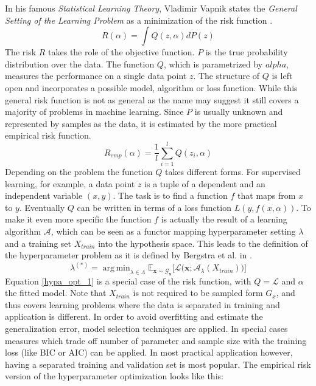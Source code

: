 \documentclass[english]{article}
\newcommand{\x}{\mathbf{x}}
\newcommand{\E}{\mathbb{E}}
\DeclareMathOperator*{\argmin}{arg\,min}
\begin{document}
In his famous \textit{Statistical Learning Theory}, Vladimir Vapnik states the \textit{General Setting of the Learning Problem} as a minimization of the risk function \cite{vapnik_overview_1999}.
\begin{equation}
R(\alpha) = \int Q(z,\alpha)dP(z)
\label{risk}
\end{equation}
The risk $R$ takes the role of the objective function. $P$ is the true probability distribution over the data. The function $Q$, which is parametrized by $alpha$, measures the performance on a single data point $z$. The structure of $Q$ is left open and incorporates a possible model, algorithm or loss function. While this general risk function is not as general as the name may suggest it still covers a majority of problems in machine learning. Since $P$ is usually unknown and represented by samples as the data, it is estimated by the more practical empirical risk function.
\begin{equation}
R_{emp}(\alpha) = \frac{1}{l} \sum_{i=1}^l Q(z_i,\alpha)
\label{empirical risk}
\end{equation}
Depending on the problem the function $Q$ takes different forms. For supervised learning, for example, a data point $z$ is a tuple of a dependent and an independent variable $(x,y)$. The task is to find a function $f$ that maps from $x$ to $y$. Eventually $Q$ can be written in terms of a loss function $L(y,f(x,\alpha))$.
To make it even more specific the function $f$ is actually the result of a learning algorithm $\mathcal{A}$, which can be seen as a functor mapping hyperparameter setting $\lambda$ and a training set $X_{train}$ into the hypothesis space. This leads to the definition of the hyperparameter problem as it is defined by Bergstra et al. in \cite{bergstra_random_2012}.
\begin{equation}
\lambda^{(*)} = \argmin_{\lambda \in \Lambda} \E_{\x \sim \mathcal{G}_\x}\big[\mathcal{L}\big(\x;\mathcal{A}_\lambda(X_{train})\big)\big]
\label{hypa_opt_1}
\end{equation}
Equation \ref{hypa_opt_1} is a special case of the risk function, with $Q = \mathcal{L}$ and $\alpha$ the fitted model. Note that $X_{train}$ is not required to be sampled form $G_x$, and thus covers learning problems where the data is separated in training and application is different.
In order to avoid overfitting and estimate the generalization error, model selection techniques are applied. In special cases measures which trade off number of parameter and sample size with the training loss (like BIC or AIC) can be applied. In most practical application however, having a separated training and validation set is most popular. The empirical risk version of the hyperparameter optimization looks like this:
\end{document}
